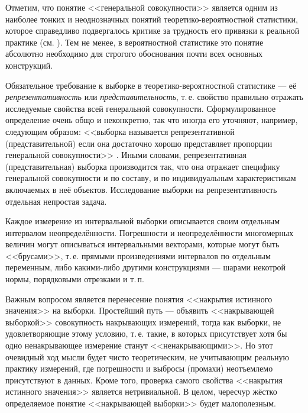 \documentclass[a5paper,openany]{book}
\begin{document}
Отметим, что понятие <<генеральной совокупности>> является одним из наиболее тонких 
и неоднозначных понятий теоретико-вероятностной статистики, которое справедливо 
подвергалось критике за трудность его привязки к реальной практике (см. 
\cite{Alimov1980, AlimovKravtsov}). Тем не менее, в вероятностной статистике 
это понятие абсолютно необходимо для строгого обоснования почти всех основных 
конструкций. 
  
Обязательное требование к выборке в теоретико-вероятностной статистике --- её 
\emph{репрезентативность} или \emph{представительность}, т.\,е. свойство правильно 
отражать исследуемые свойства всей генеральной совокупности. Сформулированное 
определение очень общо и неконкретно, так что иногда его уточняют, например, 
следующим образом: <<выборка называется репрезентативной (представительной) 
если она достаточно хорошо представляет пропорции генеральной совокупности>> 
\cite{SmirnovDunBark}.  
Иными словами, репрезентативная (представительная) выборка производится так, что 
она отражает специфику генеральной совокупности и по составу, и по индивидуальным 
характеристикам включаемых в неё объектов. Исследование выборки на репрезентативность 
отдельная непростая задача. 
  
Каждое измерение из интервальной выборки описывается своим отдельным интервалом 
неопределённости. Погрешности и неопределённости многомерных величин могут 
описываться интервальными векторами, которые могут быть <<брусами>>, т.\,е. 
прямыми произведениями интервалов по отдельным переменным, либо какими-либо другими 
конструкциями --- шарами некотрой нормы, порядковыми отрезками и т.\,п. 
  
  
Важным вопросом является перенесение понятия <<накрытия истинного значения>> 
на выборки. Простейший путь --- объявить <<накрывающей выборкой>> совокупность 
накрывающих измерений, тогда как выборки, не удовлетворяющие этому условию, т.\,е. такие, 
в которых присутствует хотя бы одно ненакрывающее измерение станут <<ненакрывающими>>. 
Но этот очевидный ход мысли будет чисто теоретическим, не учитывающим реальную практику 
измерений, где погрешности и выбросы (промахи) неотъемлемо присутствуют в данных. Кроме 
того, проверка самого свойства <<накрытия истинного значения>> является нетривиальной. 
В целом, чересчур жёстко определяемое понятие <<накрывающей выборки>> будет малополезным. 
  
\end{document}
